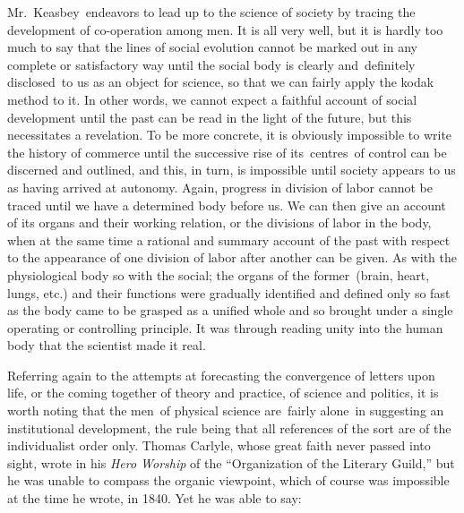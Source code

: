 \documentclass[twoside,symmetric,nobib,justified]{tufte-book}
\begin{document}
Mr.~Keasbey~endeavors to lead up to the science of society by tracing
the development of co-operation among men. It is all very well, but it
is hardly too much to say that the lines of social evolution cannot be
marked out in any complete or satisfactory way until the social body is
clearly and~definitely disclosed~to us as an object for science, so that
we can fairly apply the kodak method to it. In other words, we cannot
expect a faithful account of social development until the past can be
read in the light of the future, but this necessitates a revelation. To
be more concrete, it is obviously impossible to write the history of
commerce until the successive rise of its~centres~of control can be
discerned and outlined, and this, in turn, is impossible until society
appears to us as having arrived at autonomy. Again, progress in division
of labor cannot be traced until we have a determined body before us. We
can then give an account of its organs and their working relation, or
the divisions of labor in the body, when at the same time a rational and
summary account of the past with respect to the appearance of one
division of labor after another can be given. As with the physiological
body so with the social; the organs of the former~(brain, heart, lungs,
etc.) and their functions were gradually identified and defined only so
fast as the body came to be grasped as a unified whole and so brought
under a single operating or controlling principle. It was through
reading unity into the human body that the scientist made it real.~

Referring again to the attempts at forecasting the convergence of
letters upon life, or the coming together of theory and practice, of
science and politics, it is worth noting that the men~of physical
science are~fairly alone~in suggesting an institutional development, the
rule being that all references of the sort are of the individualist
order only. Thomas Carlyle, whose great faith never passed into sight,
wrote in his \emph{Hero Worship} of the ``Organization of the Literary
Guild,'' but he was unable to compass the organic viewpoint, which of
course was impossible at the time he wrote, in 1840. Yet he was able to
say:~
\end{document}
